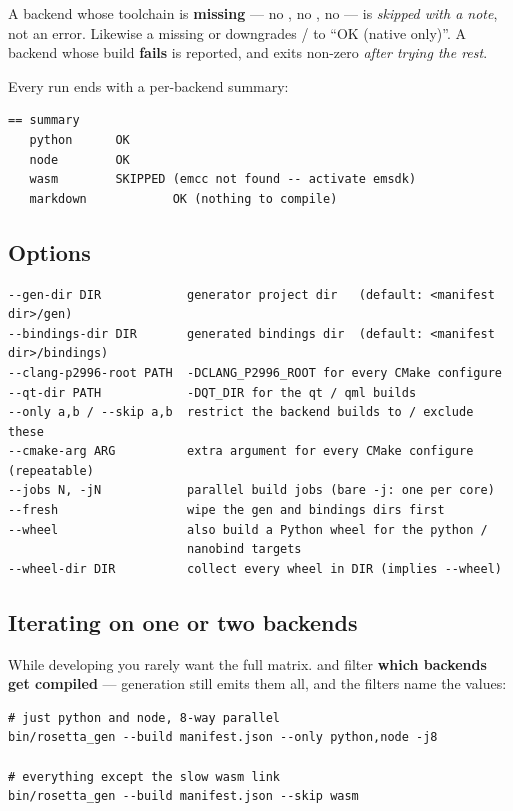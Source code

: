 A backend whose toolchain is \textbf{missing} --- no , no
, no  --- is \emph{skipped with a note}, not an error.
Likewise a missing  or  downgrades  /
 to ``OK (native only)''. A backend whose build \textbf{fails} is
reported, and  exits non-zero \emph{after trying the rest}.

Every run ends with a per-backend summary:

\begin{lstlisting}[style=plain]
== summary
   python      OK
   node        OK
   wasm        SKIPPED (emcc not found -- activate emsdk)
   markdown            OK (nothing to compile)
\end{lstlisting}

\subsection{Options}

\begin{lstlisting}[style=plain]
--gen-dir DIR            generator project dir   (default: <manifest dir>/gen)
--bindings-dir DIR       generated bindings dir  (default: <manifest dir>/bindings)
--clang-p2996-root PATH  -DCLANG_P2996_ROOT for every CMake configure
--qt-dir PATH            -DQT_DIR for the qt / qml builds
--only a,b / --skip a,b  restrict the backend builds to / exclude these
--cmake-arg ARG          extra argument for every CMake configure (repeatable)
--jobs N, -jN            parallel build jobs (bare -j: one per core)
--fresh                  wipe the gen and bindings dirs first
--wheel                  also build a Python wheel for the python /
                         nanobind targets
--wheel-dir DIR          collect every wheel in DIR (implies --wheel)
\end{lstlisting}

\subsection{Iterating on one or two backends}
\label{sec:onlyskip}

While developing you rarely want the full matrix.  and
 filter \textbf{which backends get compiled} --- generation still
emits them all, and the filters name the  values:

\begin{lstlisting}[style=sh]
# just python and node, 8-way parallel
bin/rosetta_gen --build manifest.json --only python,node -j8

# everything except the slow wasm link
bin/rosetta_gen --build manifest.json --skip wasm
\end{lstlisting}

